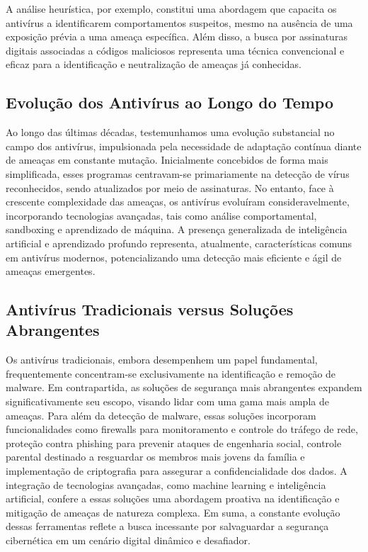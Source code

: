 \documentclass[10pt,conference,twocolumn]{article}
\begin{document}
A análise heurística, por exemplo, constitui uma abordagem que capacita os antivírus a identificarem comportamentos suspeitos, mesmo na ausência de uma exposição prévia a uma ameaça específica. Além disso, a busca por assinaturas digitais associadas a códigos maliciosos representa uma técnica convencional e eficaz para a identificação e neutralização de ameaças já conhecidas.

\subsection*{Evolução dos Antivírus ao Longo do Tempo}

Ao longo das últimas décadas, testemunhamos uma evolução substancial no campo dos antivírus, impulsionada pela necessidade de adaptação contínua diante de ameaças em constante mutação. Inicialmente concebidos de forma mais simplificada, esses programas centravam-se primariamente na detecção de vírus reconhecidos, sendo atualizados por meio de assinaturas. No entanto, face à crescente complexidade das ameaças, os antivírus evoluíram consideravelmente, incorporando tecnologias avançadas, tais como análise comportamental, sandboxing e aprendizado de máquina. A presença generalizada de inteligência artificial e aprendizado profundo representa, atualmente, características comuns em antivírus modernos, potencializando uma detecção mais eficiente e ágil de ameaças emergentes.

\subsection*{Antivírus Tradicionais versus Soluções Abrangentes}

Os antivírus tradicionais, embora desempenhem um papel fundamental, frequentemente concentram-se exclusivamente na identificação e remoção de malware. Em contrapartida, as soluções de segurança mais abrangentes expandem significativamente seu escopo, visando lidar com uma gama mais ampla de ameaças. Para além da detecção de malware, essas soluções incorporam funcionalidades como firewalls para monitoramento e controle do tráfego de rede, proteção contra phishing para prevenir ataques de engenharia social, controle parental destinado a resguardar os membros mais jovens da família e implementação de criptografia para assegurar a confidencialidade dos dados. A integração de tecnologias avançadas, como machine learning e inteligência artificial, confere a essas soluções uma abordagem proativa na identificação e mitigação de ameaças de natureza complexa. Em suma, a constante evolução dessas ferramentas reflete a busca incessante por salvaguardar a segurança cibernética em um cenário digital dinâmico e desafiador.
\end{document}
